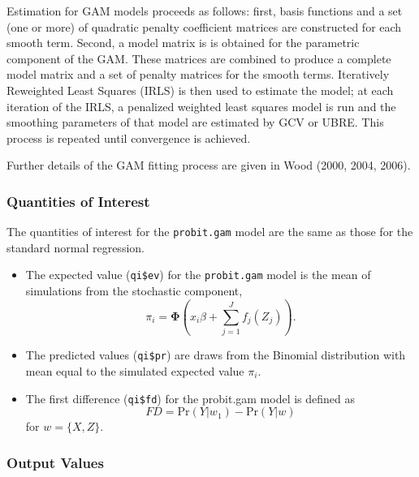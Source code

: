 Estimation for GAM models proceeds as follows: first, basis functions and a set (one or more) of quadratic penalty coefficient matrices are constructed for each smooth term. Second, a model matrix is is obtained for the parametric component of the GAM. These matrices are combined to produce a complete model matrix and a set of penalty matrices for the smooth terms. Iteratively Reweighted Least Squares (IRLS) is then used to estimate the model; at each iteration of the IRLS, a penalized weighted least squares model is run and the smoothing parameters of that model are estimated by GCV or UBRE. This process is repeated until convergence is achieved. 

Further details of the GAM fitting process are given in Wood (2000, 2004, 2006). 




\subsubsection{Quantities of Interest}
The quantities of interest for the {\tt probit.gam} model are the same as those for the standard normal regression. 
\begin{itemize}
\item The expected value ({\tt qi\$ev}) for the {\tt probit.gam} model is the mean of simulations from the stochastic component,  
\begin{equation*}
\pi_{i} = \pmb{\Phi} \left( x_{i}\beta + \sum_{j=1}^{J} f_j(Z_j) \right).
\end{equation*}


\item The predicted values ({\tt qi\$pr}) are draws from the Binomial distribution with mean equal to the simulated expected value $\pi_{i}$.

\item The first difference ({\tt qi\$fd}) for the probit.gam model is defined as 
\begin{equation*}
FD = \text{Pr}(Y| w_{1}) - \text{Pr}(Y| w)
\end{equation*}
for $w=\{X, Z\}$.
\end{itemize}



\subsubsection{Output Values}



